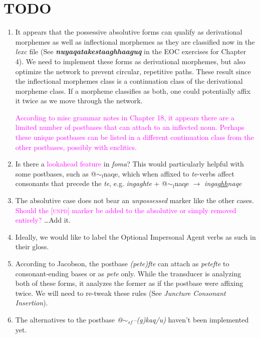 \documentclass{article}
\begin{document}
\section{TODO}

\begin{enumerate}
\item It appears that the possessive absolutive forms can qualify as derivational morphemes as well as inflectional morphemes as they are classified now in the \textit{lexc} file (See \textit{\textbf{nuyaqatakestaaghhaaguq}} in the EOC exercises for Chapter 4).
%
We need to implement these forms as derivational morphemes, but also optimize the network to prevent circular, repetitive paths.
%
These result since the inflectional morphemes class is a continuation class of the derivational morpheme class.
%
If a morpheme classifies as both, one could potentially affix it twice as we move through the network.

\textcolor{magenta}{According to misc grammar notes in Chapter 18, it appears there are a limited number of postbases that can attach to an inflected noun.
%
Perhaps these unique postbases can be listed in a different continuation class from the other postbases, possibly with enclitics.}

\item Is there a \textcolor{magenta}{lookahead feature} in \textit{foma}? This would particularly helpful with some postbases, such as @${\sim}_\text{f}$naqe, which when affixed to \textit{te}-verbs affect consonants that precede the \textit{te}, e.g. \textit{ingaghte} + @${\sim}_\text{f}$naqe $\rightarrow$ \textit{inga\uline{ghh}naqe}

\item The absolutive case does not bear an \textit{unpossessed} marker like the other cases. \textcolor{magenta}{Should the [\textsc{unpd}] marker be added to the absolutive or simply removed entirely?} \ldots Add it.

\item Ideally, we would like to label the Optional Impersonal Agent verbs as such in their gloss.

\item According to Jacobson, the postbase \textit{(pete)fte} can attach as \textit{petefte} to consonant-ending bases or as \textit{pete} only.
%
While the transducer is analyzing both of these forms, it analyzes the former as if the postbase were affixing twice.
%
We will need to re-tweak these rules (See \textit{Juncture Consonant Insertion}).

\item The alternatives to the postbase \textit{@$\sim_{sf}$--(g)kaq/u)} haven't been implemented yet.

\end{enumerate}
\end{document}

